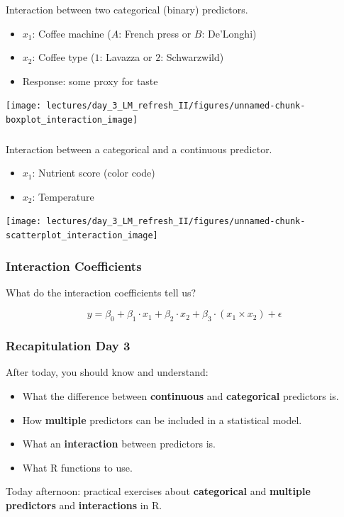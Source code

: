 \documentclass{beamer}
\begin{document}
\begin{frame}
  \frametitle{}
  Interaction between two categorical (binary) predictors.
  
  \begin{itemize}
    \item $x_1$: Coffee machine ($A$: French press or $B$: De'Longhi)
    \item $x_2$: Coffee type ($1$: Lavazza or $2$: Schwarzwild)
    \item Response: some proxy for taste
  \end{itemize}
  
  \begin{center}
    \texttt{[image: lectures/day\_3\_LM\_refresh\_II/figures/unnamed-chunk-boxplot\_interaction\_image]} 
  \end{center}
\end{frame}

\begin{frame}
  \frametitle{}
  Interaction between a categorical and a continuous predictor.
  
  \begin{itemize}
    \item $x_1$: Nutrient score (color code)
    \item $x_2$: Temperature
  \end{itemize}
  
  \begin{center}
    \texttt{[image: lectures/day\_3\_LM\_refresh\_II/figures/unnamed-chunk-scatterplot\_interaction\_image]} 
  \end{center}
\end{frame}

\begin{frame}
  \frametitle{Interaction Coefficients}
  What do the interaction coefficients tell us?
  
  \begin{equation*}
    y = \beta_0 + \beta_1 \cdot x_1 + \beta_2 \cdot x_2 + \beta_3 \cdot (x_1 \times x_2) + \epsilon
  \end{equation*}
\end{frame}

\begin{frame}
  \frametitle{Recapitulation Day 3}
  After today, you should know and understand:
  \begin{itemize}
    \item What the difference between \textbf{continuous} and \textbf{categorical} predictors is.
    \item How \textbf{multiple} predictors can be included in a statistical model.
    \item What an \textbf{interaction} between predictors is.
    \item What R functions to use.
  \end{itemize}
  
  \vspace{1cm}
  Today afternoon: practical exercises about \textbf{categorical} and \textbf{multiple predictors} and \textbf{interactions} in R.
\end{frame}
\end{document}
